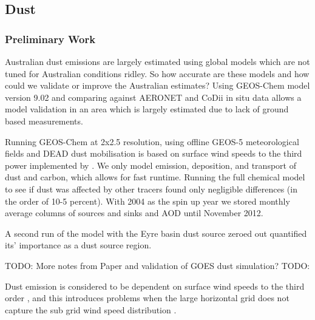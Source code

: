 \subsection{Dust}
\subsubsection{Preliminary Work}
Australian dust emissions are largely estimated using global models which are not tuned for Australian conditions ridley\cite{Ridley_2013,Duncan_Fairlie_2007}.
So how accurate are these models and how could we validate or improve the Australian estimates?
Using GEOS-Chem model version 9.02 and comparing against AERONET and CoDii in situ data allows a model validation in an area which is largely estimated due to lack of ground based measurements.

Running GEOS-Chem at 2x2.5 resolution, using offline GEOS-5 meteorological fields and DEAD dust mobilisation is based on surface wind speeds to the third power implemented by \citet{Duncan_Fairlie_2007}. We only model emission, deposition, and transport of dust and carbon, which allows for fast runtime. Running the full chemical model to see if dust was affected by other tracers found only negligible differences (in the order of 10-5 percent). With 2004 as the spin up year we stored monthly average columns of sources and sinks and AOD until November 2012.

A second run of the model with the Eyre basin dust source zeroed out quantified its' importance as a dust source region.

TODO: More notes from Paper and validation of GOES dust simulation?
TODO: 
  
Dust emission is considered to be dependent on surface wind speeds to the third order \cite{Duncan_Fairlie_2007}, and this introduces problems when the large horizontal grid does not capture the sub grid wind speed distribution \cite{Ridley_2013}.